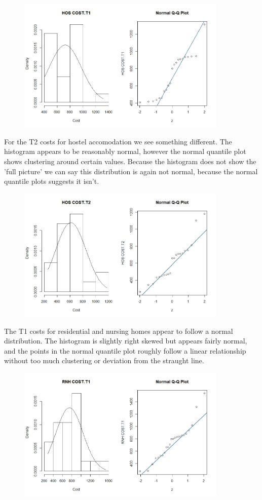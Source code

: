 \documentclass[]{article}
\begin{document}
\begin{figure}[H]
\centering
\includegraphics[width=10cm]{RStudio/jpeg/Norm_HOS_T1.jpeg}
\end{figure}
For the T2 costs for hostel accomodation we see something different. The histogram appears to be reasonably normal, however the normal quantile plot shows clustering around certain values. Because the histogram does not show the 'full picture' we can say this distribution is again not normal, because the normal quantile plots suggests it isn't.
\begin{figure}[H]
\centering
\includegraphics[width=10cm]{RStudio/jpeg/Norm_HOS_T2.jpeg}
\end{figure}
The T1 costs for residential and nursing homes appear to follow a normal distribution. The histogram is slightly right skewed but appears fairly normal, and the points in the normal quantile plot roughly follow a linear relationship without too much clustering or deviation from the straught line.
\begin{figure}[H]
\centering
\includegraphics[width=10cm]{RStudio/jpeg/Norm_RNH_T1.jpeg}
\end{figure}
\end{document}
